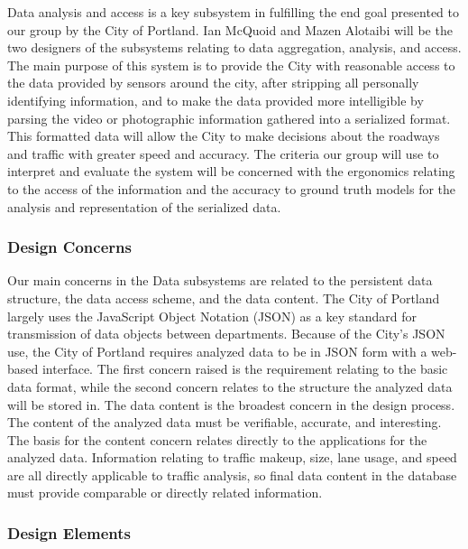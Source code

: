Data analysis and access is a key subsystem in fulfilling the end goal presented to our group by the City of Portland. Ian McQuoid and Mazen Alotaibi will be the two designers of the subsystems relating to data aggregation, analysis, and access.  The main purpose of this system is to provide the City with reasonable access to the data provided by sensors around the city, after stripping all personally identifying information, and to make the data provided more intelligible by parsing the video or photographic information gathered into a serialized format. This formatted data will allow the City to make decisions about the roadways and traffic with greater speed and accuracy. The criteria our group will use to interpret and evaluate the system will be concerned with the ergonomics relating to the access of the information and the accuracy to ground truth models for the analysis and representation of the serialized data. 

\subsubsection{Design Concerns}

Our main concerns in the Data subsystems are related to the persistent data structure, the data access scheme, and the data content. The City of Portland largely uses the JavaScript Object Notation (JSON) as  a key standard for transmission of data objects between departments. Because of the City's JSON use, the City of Portland requires analyzed data to be in JSON form with a web-based interface. The first concern raised is the requirement relating to the basic data format, while the second concern relates to the structure the analyzed data will be stored in. The data content is the broadest concern in the design process. The content of the analyzed data must be verifiable, accurate, and interesting. The basis for the content concern relates directly to the applications for the analyzed data. Information relating to traffic makeup, size, lane usage, and speed are all directly applicable to traffic analysis, so final data content in the database must provide comparable or directly related information.

\subsubsection{Design Elements}

